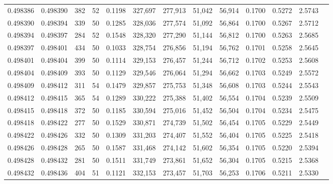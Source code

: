 \begin{tabular}{rrrrrrrrrrrrr}
0.498386 & 0.498390 & 382 &  52 &                                     0.1198 & 327,697 & 277,913 &  51,042 &  56,914 & 0.1700 & 0.5272 & 2.5743 \\
0.498390 & 0.498394 & 339 &  50 &                                     0.1285 & 328,036 & 277,574 &  51,092 &  56,864 & 0.1700 & 0.5267 & 2.5712 \\
0.498394 & 0.498397 & 284 &  52 &                                     0.1548 & 328,320 & 277,290 &  51,144 &  56,812 & 0.1700 & 0.5263 & 2.5685 \\
0.498397 & 0.498401 & 434 &  50 &                                     0.1033 & 328,754 & 276,856 &  51,194 &  56,762 & 0.1701 & 0.5258 & 2.5645 \\
0.498401 & 0.498404 & 399 &  50 &                                     0.1114 & 329,153 & 276,457 &  51,244 &  56,712 & 0.1702 & 0.5253 & 2.5608 \\
0.498404 & 0.498409 & 393 &  50 &                                     0.1129 & 329,546 & 276,064 &  51,294 &  56,662 & 0.1703 & 0.5249 & 2.5572 \\
0.498409 & 0.498412 & 311 &  54 &                                     0.1479 & 329,857 & 275,753 &  51,348 &  56,608 & 0.1703 & 0.5244 & 2.5543 \\
0.498412 & 0.498415 & 365 &  54 &                                     0.1289 & 330,222 & 275,388 &  51,402 &  56,554 & 0.1704 & 0.5239 & 2.5509 \\
0.498415 & 0.498418 & 372 &  50 &                                     0.1185 & 330,594 & 275,016 &  51,452 &  56,504 & 0.1704 & 0.5234 & 2.5475 \\
0.498418 & 0.498422 & 277 &  50 &                                     0.1529 & 330,871 & 274,739 &  51,502 &  56,454 & 0.1705 & 0.5229 & 2.5449 \\
0.498422 & 0.498426 & 332 &  50 &                                     0.1309 & 331,203 & 274,407 &  51,552 &  56,404 & 0.1705 & 0.5225 & 2.5418 \\
0.498426 & 0.498428 & 265 &  50 &                                     0.1587 & 331,468 & 274,142 &  51,602 &  56,354 & 0.1705 & 0.5220 & 2.5394 \\
0.498428 & 0.498432 & 281 &  50 &                                     0.1511 & 331,749 & 273,861 &  51,652 &  56,304 & 0.1705 & 0.5215 & 2.5368 \\
0.498432 & 0.498436 & 404 &  51 &                                     0.1121 & 332,153 & 273,457 &  51,703 &  56,253 & 0.1706 & 0.5211 & 2.5330 \\

\end{tabular}
